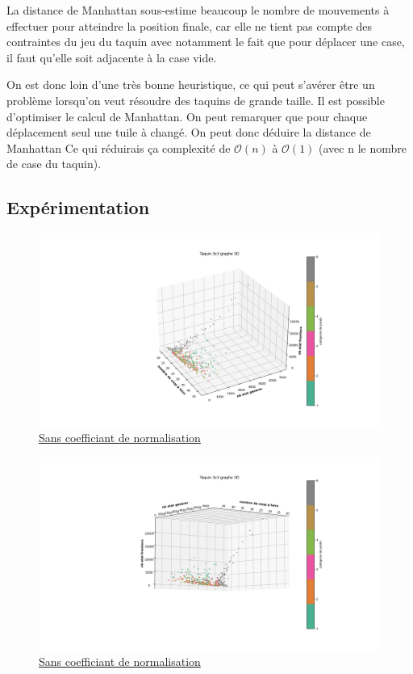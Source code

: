 \documentclass[a4paper, 12pt]{article}
\begin{document}
La distance de Manhattan sous-estime beaucoup le nombre de mouvements à effectuer pour atteindre la position finale, car elle ne tient pas compte des contraintes du jeu du taquin avec notamment le fait que pour déplacer une case, il faut qu'elle soit adjacente à la case vide.

On est donc loin d'une très bonne heuristique, ce qui peut s'avérer être un problème lorsqu'on veut résoudre des taquins de grande taille.
Il est possible d'optimiser le calcul de Manhattan. On peut remarquer que pour chaque déplacement seul une tuile à changé. On peut donc déduire la distance de Manhattan Ce qui réduirais ça complexité de $\mathcal{O}(n)$ à $\mathcal{O}(1)$ (avec n le nombre de case du taquin).

\subsection{Expérimentation}
\begin{figure}[H]
    \centering
    \includegraphics[width=\textwidth]{graphe 3d Taquin 3x3}
    \caption{\underline{Sans coefficiant de normalisation}}
\end{figure}
\begin{figure}[H]
    \centering
    \includegraphics[width=\textwidth]{graphe 3d Taquin 3x3(1)}
    \caption{\underline{Sans coefficiant de normalisation}}
\end{figure}
\end{document}
